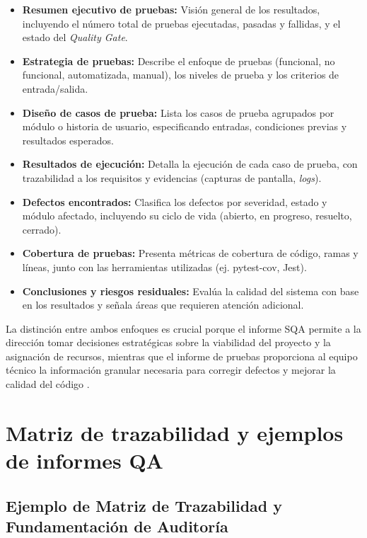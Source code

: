 \documentclass[12pt, letterpaper]{article}
\begin{document}
\begin{itemize}
    \item \textbf{Resumen ejecutivo de pruebas:} Visión general de los resultados, incluyendo el número total de pruebas ejecutadas, pasadas y fallidas, y el estado del \emph{Quality Gate}.
    \item \textbf{Estrategia de pruebas:} Describe el enfoque de pruebas (funcional, no funcional, automatizada, manual), los niveles de prueba y los criterios de entrada/salida.
    \item \textbf{Diseño de casos de prueba:} Lista los casos de prueba agrupados por módulo o historia de usuario, especificando entradas, condiciones previas y resultados esperados.
    \item \textbf{Resultados de ejecución:} Detalla la ejecución de cada caso de prueba, con trazabilidad a los requisitos y evidencias (capturas de pantalla, \emph{logs}).
    \item \textbf{Defectos encontrados:} Clasifica los defectos por severidad, estado y módulo afectado, incluyendo su ciclo de vida (abierto, en progreso, resuelto, cerrado).
    \item \textbf{Cobertura de pruebas:} Presenta métricas de cobertura de código, ramas y líneas, junto con las herramientas utilizadas (ej. pytest-cov, Jest).
    \item \textbf{Conclusiones y riesgos residuales:} Evalúa la calidad del sistema con base en los resultados y señala áreas que requieren atención adicional.
\end{itemize}

La distinción entre ambos enfoques es crucial porque el informe SQA permite a la dirección tomar decisiones estratégicas sobre la viabilidad del proyecto y la asignación de recursos, mientras que el informe de pruebas proporciona al equipo técnico la información granular necesaria para corregir defectos y mejorar la calidad del código \parencite{galin2018, pressman2020}.

\section{Matriz de trazabilidad y ejemplos de informes QA}

\subsection{Ejemplo de Matriz de Trazabilidad y Fundamentación de Auditoría}
\end{document}
